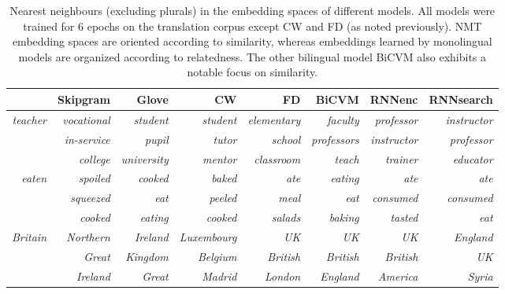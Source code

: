 \begin{table}[t]
\begin{center}
\begin{tabular}{r | r  r  r | r r | r r}
&\bf Skipgram &\bf Glove &\bf CW&\bf FD &\bf BiCVM  &\bf RNNenc &\bf RNNsearch \\ 
\hline
\emph{teacher}  & {\small \emph{vocational}} &  {\small \emph{student}} 
& {\small \emph{student}} &{\small \emph{elementary}} & {\small  \emph{faculty}} & {\small \emph{professor}}  & {\small \emph{instructor}} \\ 
 & {\small \emph{in-service}} &  {\small \emph{pupil}} 
& {\small \emph{tutor}} & {\small \emph{school}}& {\small  \emph{professors}} & {\small \emph{instructor}}  & {\small \emph{professor}} \\ 
 & {\small \emph{college}} &  {\small \emph{university}} 
& {\small \emph{mentor}} & {\small \emph{classroom}}& {\small \emph{teach}}& {\small \emph{trainer}}  & {\small \emph{educator}} \\ 
\hdashline
\emph{eaten}  & {\small \emph{spoiled}} &  {\small \emph{cooked}} 
&  {\small \emph{baked}} &{\small \emph{ate}}& {\small  \emph{eating}}& {\small \emph{ate}} & {\small \emph{ate}} \\ 
  & {\small \emph{squeezed}} &  {\small \emph{eat}} 
&  {\small \emph{peeled}} &{\small \emph{meal}}& {\small \emph{eat}}& {\small \emph{consumed}} & {\small \emph{consumed}} \\ 
  & {\small \emph{cooked}} &  {\small \emph{eating}} 
&  {\small \emph{cooked}} &{\small \emph{salads}}& {\small \emph{baking}}& {\small \emph{tasted}} & {\small \emph{eat}} \\ 
\hdashline
\emph{Britain}  & {\small \emph{Northern}} &  {\small \emph{Ireland}} 
& {\small \emph{Luxembourg}} &{\small \emph{UK}}& {\small \emph{UK}} & {\small  \emph{UK}} & {\small \emph{England}} \\ 
& {\small \emph{Great}} &  {\small \emph{Kingdom}} 
& {\small \emph{Belgium}} &{\small \emph{British}}& {\small \emph{British}} & {\small  \emph{British}} & {\small \emph{UK}} \\ 
 & {\small \emph{Ireland}} &  {\small \emph{Great}} 
& {\small \emph{Madrid}} &{\small \emph{London}}& {\small \emph{England}} & {\small  \emph{America}} & {\small \emph{Syria}} \\ 


\end{tabular}
\caption{Nearest neighbours (excluding plurals) in the embedding spaces of different models. All models were trained for 6 epochs on the translation corpus except CW and FD (as noted previously). NMT embedding spaces are oriented according to similarity, whereas embeddings learned by monolingual models are organized according to relatedness. The other bilingual model BiCVM also exhibits a notable focus on similarity.}
\label{table:neigh}
\end{center}
\vspace{-5mm}
\end{table}

